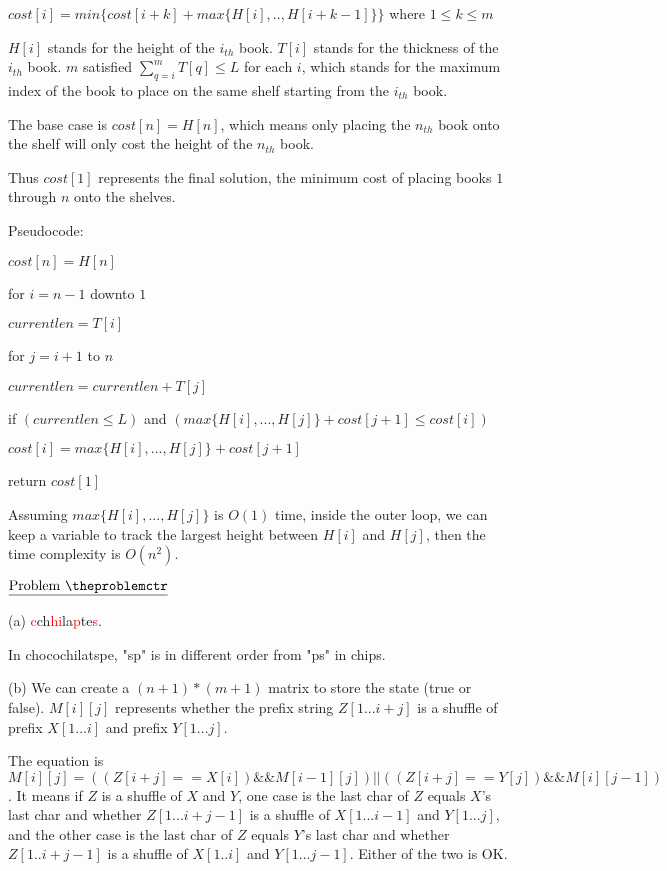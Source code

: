 \documentclass[11pt]{article}
\def\pp{\par\noindent}
\begin{document}
$cost[i] = min \{cost[i+k]+max\{H[i],..,H[i+k-1]\}\}$ where $1 \le k \le m$

$H[i]$ stands for the height of the $i_{th}$ book. $T[i]$ stands for the thickness of the $i_{th}$ book. $m$ satisfied $\sum_{q=i}^{m} T[q] \le L$ for each $i$, which stands for the maximum index of the book to place on the same shelf starting from the $i_{th}$ book.

The base case is $cost[n] = H[n]$, which means only placing the $n_{th}$ book onto the shelf will only cost the height of the $n_{th}$ book.

Thus $cost[1]$ represents the final solution, the minimum cost of placing books $1$ through $n$ onto the shelves.

\bigskip
Pseudocode:

$cost[n] = H[n]$

for $i = n-1$ downto $1$

\hspace{.5 cm}$currentlen = T[i]$

\hspace{.5 cm}for $j = i+1$ to $n$

\hspace{1 cm}$currentlen = currentlen+T[j]$

\hspace{1 cm}if $(currentlen \le L)$ and $(max\{H[i],...,H[j]\}+cost[j+1] \le cost[i])$

\hspace{1.5 cm}$cost[i] = max\{H[i],...,H[j]\}+cost[j+1]$

return $cost[1]$

\bigskip

Assuming $max\{H[i],...,H[j]\}$ is $O(1)$ time, inside the outer loop, we can keep a variable to track the largest height between $H[i]$ and $H[j]$, then the time complexity is $O(n^2)$.


\vfill
\newpage
\addtocounter{problemctr}{1}
\bigskip
\noindent
$\underline{\rm Problem\ \theproblemctr}$\pp
\noindent
(a) \textcolor{red}{c}ch\textcolor{red}{hi}la\textcolor{red}{p}te\textcolor{red}{s}.

In chocochilatspe, "sp" is in different order from "ps" in chips.

\bigskip
\bigskip
\noindent 
(b) We can create a $(n+1)*(m+1)$ matrix to store the state (true or false). $M[i][j]$ represents whether the prefix string $Z[1...i+j]$ is a shuffle of prefix $X[1...i]$ and prefix $Y[1...j]$.

The equation is $M[i][j] = ((Z[i+j] == X[i]) \&\& M[i - 1][j]) || ((Z[i+j] == Y[j]) \&\& M[i][j - 1])$. It means if $Z$ is a shuffle of $X$ and $Y$, one case is the last char of $Z$ equals $X$'s last char and whether $Z[1...i+j-1]$ is a shuffle of $X[1...i-1]$ and $Y[1...j]$, and the other case is the last char of $Z$ equals $Y$'s last char and whether $Z[1..i+j-1]$ is a shuffle of $X[1..i]$ and $Y[1...j-1]$. Either of the two is OK.
\end{document}
